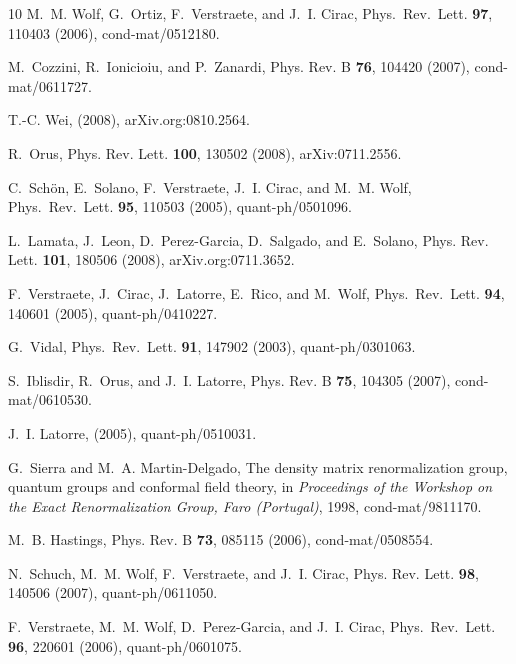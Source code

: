 \documentclass{article}
\theoremstyle{plain}
\theoremstyle{definition}
\numberwithin{equation}{section}  %
\begin{document}
\begin{thebibliography}{10}
    M.~M. Wolf, G.~Ortiz, F.~Verstraete, and J.~I. Cirac,
    \newblock Phys.\ Rev.\ Lett. {\bf 97}, 110403 (2006), cond-mat/0512180.

    M.~Cozzini, R.~Ionicioiu, and P.~Zanardi,
    \newblock Phys. Rev. B {\bf 76}, 104420 (2007), cond-mat/0611727.

    T.-C. Wei,
    \newblock (2008), arXiv.org:0810.2564.

    R.~Orus,
    \newblock Phys. Rev. Lett. {\bf 100}, 130502 (2008), arXiv:0711.2556.

    C.~Sch{\"o}n, E.~Solano, F.~Verstraete, J.~I. Cirac, and M.~M. Wolf,
    \newblock Phys.\ Rev.\ Lett. {\bf 95}, 110503 (2005), quant-ph/0501096.

    L.~Lamata, J.~Leon, D.~Perez-Garcia, D.~Salgado, and E.~Solano,
    \newblock Phys. Rev. Lett. {\bf 101}, 180506 (2008), arXiv.org:0711.3652.

    F.~Verstraete, J.~Cirac, J.~Latorre, E.~Rico, and M.~Wolf,
    \newblock Phys.\ Rev.\ Lett. {\bf 94}, 140601 (2005), quant-ph/0410227.

    G.~Vidal,
    \newblock Phys.\ Rev.\ Lett. {\bf 91}, 147902 (2003), quant-ph/0301063.

    S.~Iblisdir, R.~Orus, and J.~I. Latorre,
    \newblock Phys. Rev. B {\bf 75}, 104305 (2007), cond-mat/0610530.

    J.~I. Latorre,
    \newblock (2005), quant-ph/0510031.

    G.~Sierra and M.~A. Martin-Delgado,
    \newblock The density matrix renormalization group, quantum groups and
    conformal field theory,
    \newblock in {\em Proceedings of the Workshop on the Exact Renormalization
            Group, Faro (Portugal)}, 1998, cond-mat/9811170.

    M.~B. Hastings,
    \newblock Phys. Rev. B {\bf 73}, 085115 (2006), cond-mat/0508554.

    N.~Schuch, M.~M. Wolf, F.~Verstraete, and J.~I. Cirac,
    \newblock Phys. Rev. Lett. {\bf 98}, 140506 (2007), quant-ph/0611050.

    F.~Verstraete, M.~M. Wolf, D.~Perez-Garcia, and J.~I. Cirac,
    \newblock Phys.\ Rev.\ Lett. {\bf 96}, 220601 (2006), quant-ph/0601075.


\end{thebibliography}
\end{document}
